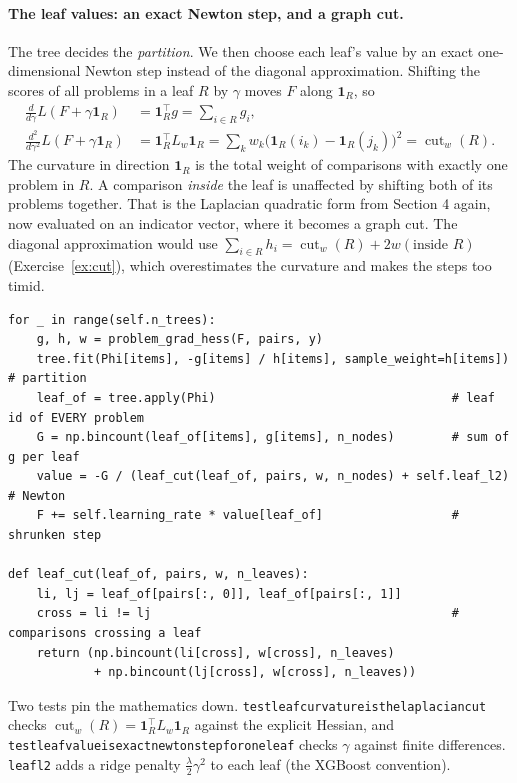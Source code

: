 \documentclass[11pt]{article}
\theoremstyle{definition}
\theoremstyle{plain}
\theoremstyle{remark}
\newcommand{\code}[1]{\texttt{#1}}
\renewcommand{\_}{\oldunderscore\allowbreak}
\newcommand{\file}[1]{\textcolor{blue!50!black}{\texttt{#1}}}
\newcommand{\codefrom}[1]{\par\smallskip\noindent{\footnotesize\textbf{From} \file{#1}}}
\begin{document}
\paragraph{The leaf values: an exact Newton step, and a graph cut.}
The tree decides the \emph{partition}. We then choose each leaf's value by an exact one-dimensional Newton step instead of the
diagonal approximation. Shifting the scores of all problems in a leaf $R$ by $\gamma$ moves $F$ along $\mathbf 1_R$, so
\begin{align*}
  \frac{d}{d\gamma}L(F+\gamma\mathbf 1_R)&=\mathbf 1_R^\top g=\sum_{i\in R}g_i,\\
  \frac{d^2}{d\gamma^2}L(F+\gamma\mathbf 1_R)&=\mathbf 1_R^\top L_w\mathbf 1_R=\sum_kw_k\bigl(\mathbf 1_R(i_k)-\mathbf 1_R(j_k)\bigr)^2=\operatorname{cut}_w(R).
\end{align*}
The curvature in direction $\mathbf 1_R$ is the total weight of comparisons with exactly one problem in $R$. A comparison \emph{inside} the leaf is
unaffected by shifting both of its problems together. That is the Laplacian quadratic form from Section 4 again, now evaluated on an indicator vector,
where it becomes a graph cut. The diagonal approximation would use $\sum_{i\in R}h_i=\operatorname{cut}_w(R)+2w(\text{inside }R)$
(Exercise~\ref{ex:cut}), which overestimates the curvature and makes the steps too timid.

\codefrom{src/calcdiff/models/boosted\_bt.py}
\begin{lstlisting}
for _ in range(self.n_trees):
    g, h, w = problem_grad_hess(F, pairs, y)
    tree.fit(Phi[items], -g[items] / h[items], sample_weight=h[items])  # partition
    leaf_of = tree.apply(Phi)                                 # leaf id of EVERY problem
    G = np.bincount(leaf_of[items], g[items], n_nodes)        # sum of g per leaf
    value = -G / (leaf_cut(leaf_of, pairs, w, n_nodes) + self.leaf_l2)  # Newton
    F += self.learning_rate * value[leaf_of]                  # shrunken step

def leaf_cut(leaf_of, pairs, w, n_leaves):
    li, lj = leaf_of[pairs[:, 0]], leaf_of[pairs[:, 1]]
    cross = li != lj                                          # comparisons crossing a leaf
    return (np.bincount(li[cross], w[cross], n_leaves)
            + np.bincount(lj[cross], w[cross], n_leaves))
\end{lstlisting}
Two tests pin the mathematics down. \code{test\_leaf\_curvature\_is\_the\_laplacian\_cut} checks
$\operatorname{cut}_w(R)=\mathbf 1_R^\top L_w\mathbf 1_R$ against the explicit Hessian, and \code{test\_leaf\_value\_is\_exact\_newton\_step\_for\_one\_leaf}
checks $\gamma$ against finite differences. \code{leaf\_l2} adds a ridge penalty $\frac{\lambda}{2}\gamma^2$ to each leaf (the XGBoost convention).
\end{document}

